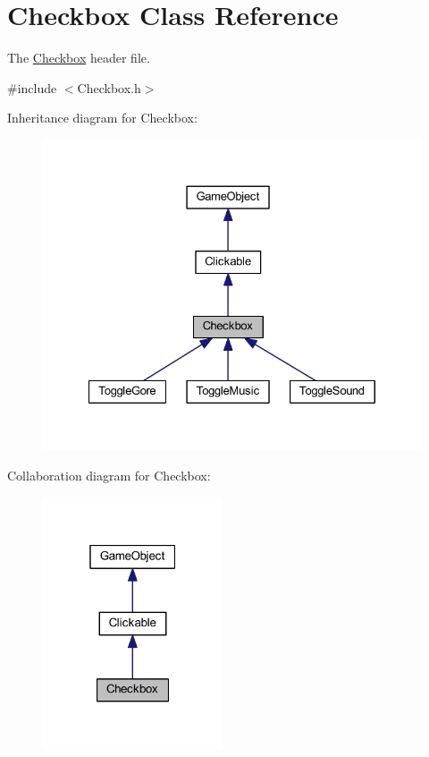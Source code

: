 \hypertarget{class_checkbox}{\section{Checkbox Class Reference}
\label{class_checkbox}
}


The \hyperlink{class_checkbox}{Checkbox} header file.  




{\ttfamily \#include $<$Checkbox.\+h$>$}



Inheritance diagram for Checkbox\+:\nopagebreak
\begin{figure}[H]
\begin{center}
\leavevmode
\includegraphics[width=327pt]{class_checkbox__inherit__graph}
\end{center}
\end{figure}


Collaboration diagram for Checkbox\+:\nopagebreak
\begin{figure}[H]
\begin{center}
\leavevmode
\includegraphics[width=151pt]{class_checkbox__coll__graph}
\end{center}
\end{figure}
